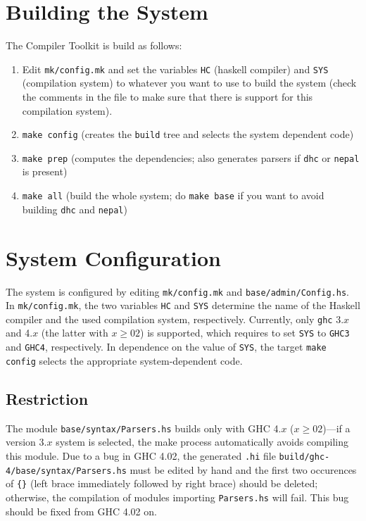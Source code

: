 \documentclass{report}
\newcommand{\code}[1]{\texttt{#1}}
\begin{document}
\section{Building the System}

The Compiler Toolkit is build as follows:
%
\begin{enumerate}
\item Edit \code{mk/config.mk} and set the variables \code{HC} (haskell
  compiler) and \code{SYS} (compilation system) to whatever you want to use to
  build the system (check the comments in the file to make sure that there is
  support for this compilation system).
\item \code{make config} (creates the \code{build} tree and selects the system 
  dependent code)
\item \code{make prep} (computes the dependencies; also generates parsers if
  \code{dhc} or \code{nepal} is present)
\item \code{make all} (build the whole system; do \code{make base} if you want 
  to avoid building \code{dhc} and \code{nepal})
\end{enumerate}


\section{System Configuration}

The system is configured by editing \code{mk/config.mk} and
\code{base/admin/Config.hs}.  In \code{mk/config.mk}, the two variables
\code{HC} and \code{SYS} determine the name of the Haskell compiler and the
used compilation system, respectively.  Currently, only \code{ghc} 3.$x$ and
4.$x$ (the latter with $x\geq02$) is supported, which requires to set
\code{SYS} to \code{GHC3} and \code{GHC4}, respectively.  In dependence on the
value of \code{SYS}, the target \code{make config} selects the appropriate
system-dependent code.

\subsection{Restriction}

The module \code{base/syntax/Parsers.hs} builds only with GHC 4.$x$
($x\geq02$)---if a version 3.$x$ system is selected, the make process
automatically avoids compiling this module.  Due to a bug in GHC 4.02, the
generated \code{.hi} file \code{build/ghc-4/base/syntax/Parsers.hs} must be
edited by hand and the first two occurences of \code{\{\}} (left brace
immediately followed by right brace) should be deleted; otherwise, the
compilation of modules importing \code{Parsers.hs} will fail.  This bug should
be fixed from GHC 4.02 on.
\end{document}
